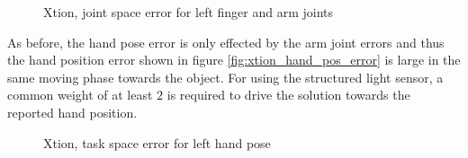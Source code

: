 \begin{figure}
\centering
{}
%
\caption{Xtion, joint space error for left finger and arm joints}
\label{fig:xtion_joint_error}
\end{figure}

As before, the hand pose error is only effected by the arm joint errors and thus the hand position error shown in figure \ref{fig:xtion_hand_pos_error} is large in the same moving phase towards the object. For using the structured light sensor, a common weight of at least $2$ is required to drive the solution towards the reported hand position.

\begin{figure}
\centering
{}
%
\caption{Xtion, task space error for left hand pose}
\label{fig:xtion_hand_pose_error}
\end{figure}

